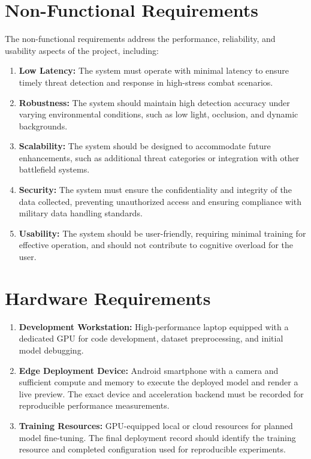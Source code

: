 \section{Non-Functional Requirements}\label{sec:nonfunctional}
The non-functional requirements address the performance, reliability, and usability aspects of the
project, including:
\begin{enumerate}[label=\roman*.]
  \item \textbf{Low Latency:} The system must operate with minimal latency to ensure timely threat
    detection and response in high-stress combat scenarios.
  \item \textbf{Robustness:} The system should maintain high detection accuracy under varying
    environmental conditions, such as low light, occlusion, and dynamic backgrounds.
  \item \textbf{Scalability:} The system should be designed to accommodate future enhancements, such
    as additional threat categories or integration with other battlefield systems.
  \item \textbf{Security:} The system must ensure the confidentiality and integrity of the data
    collected, preventing unauthorized access and ensuring compliance with military data handling
    standards.
  \item \textbf{Usability:} The system should be user-friendly, requiring minimal training for
    effective operation, and should not contribute to cognitive overload for the user.
  \label{end:nonfunctional}
\end{enumerate}
\section{Hardware Requirements}\label{sec:hardware}
\begin{enumerate}[label=\roman*.]
  \item \textbf{Development Workstation:} High-performance laptop equipped with a dedicated GPU for
    code development, dataset preprocessing, and initial model debugging.
  \item \textbf{Edge Deployment Device:} Android smartphone with a camera and sufficient compute
    and memory to execute the deployed model and render a live preview. The exact device and
    acceleration backend must be recorded for reproducible performance measurements.
  \item \textbf{Training Resources:} GPU-equipped local or cloud resources for planned model
     fine-tuning. The final deployment record should identify the training resource and completed
     configuration used for reproducible experiments.
  \label{end:hardware}
\end{enumerate}
